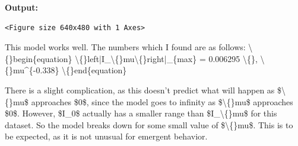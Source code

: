 \documentclass{article}
\begin{document}
\textbf{Output:}\begin{verbatim}
<Figure size 640x480 with 1 Axes>
\end{verbatim}

This model works well. The numbers which I found are as follows:
\textbackslash\{\}begin\{equation\}
\textbackslash\{\}left|I\_\textbackslash\{\}mu\textbackslash\{\}right|\_\{max\} = 0.006295 \textbackslash\{\}, \textbackslash\{\}mu\textasciicircum{}\{-0.338\} 
\textbackslash\{\}end\{equation\}

There is a slight complication, as this doesn't predict what will happen as \$\textbackslash\{\}mu\$ approaches \$0\$, since the model goes to infinity as \$\textbackslash\{\}mu\$ approaches \$0\$. However, \$I\_0\$ actually has a smaller range than \$I\_\textbackslash\{\}mu\$ for this dataset. So the model breaks down for some small value of \$\textbackslash\{\}mu\$. This is to be expected, as it is not unusual for emergent behavior.
\end{document}
